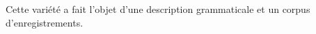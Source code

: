 \documentclass{article}
\begin{document}
Cette variété a fait l'objet d'une description grammaticale \parencite{jacques21grammar} et un corpus d'enregistrements.

\printbibliography
\end{document}
